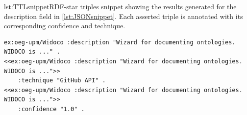 \begin{captionedlisting}{lst:TTLsnippet}{RDF-star triples snippet showing the results generated for the description field in \cref{lst:JSONsnippet}. Each asserted triple is annotated with its corresponding confidence and technique.}
\centering
{
\begin{lstlisting}[basicstyle=\ttfamily\small,label={list:example1},columns=flexible]
ex:oeg-upm/Widoco :description "Wizard for documenting ontologies. WIDOCO is ..." .
<<ex:oeg-upm/Widoco :description "Wizard for documenting ontologies. WIDOCO is ...">> 
    :technique "GitHub API" .
<<ex:oeg-upm/Widoco :description "Wizard for documenting ontologies. WIDOCO is ...">> 
    :confidence "1.0" .
\end{lstlisting}
}
\end{captionedlisting}




